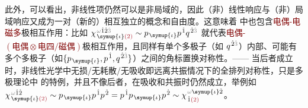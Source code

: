 此外，可以看出，非线性项仍然可以是非局域的，因此（非）线性响应与（非）局域响应又成为一对（新的）相互独立的概念和自由度。这意味着  中也包含\textcolor{Maroon}{电偶-电磁多}极相互作用：比如 $\chi^{\;\! \mathcolor{gray}{\omega} \hat{1} \hat{2} \mathcolor{gray}{\hat{3}}}_{\;\! \symup{\iota} \textcolor{Maroon}{(2)}} \sim p_{\;\! \symup{\iota}} p^{\;\! \hat{1}} q^{\;\! \hat{2} \mathcolor{gray}{\hat{3}}}$ 就代表\textcolor{Maroon}{电偶-$(\text{电偶}\otimes\text{电四/磁偶})$}极相互作用，且同样有单个多极子（如 $q^{\;\! \hat{2} \mathcolor{gray}{\hat{3}}}$）内部、可能有多个{多极子}（如$\{p_{\;\! \symup{\iota}}, p^{\;\! \hat{1}}, q^{\;\! \hat{2} \mathcolor{gray}{\hat{3}}}\}$）之间的角标置换对称性。—— 当后者成立时，非线性光学中无损/无耗散/无吸收即远离共振情况下的全排列对称性\cite{boydNonlinearOptics2019}，只是多极理论中  的特例，并且不像后者，在吸收和共振时仍然成立，举例如 $\chi^{\;\! \mathcolor{gray}{\omega} \hat{1} \hat{2}}_{\;\! \symup{\iota} \textcolor{Maroon}{(2)}} \sim p_{\;\! \symup{\iota}} p^{\;\! \hat{1}} p^{\;\! \hat{2}} = p^{\;\! \hat{1}} p_{\;\! \symup{\iota}} p^{\;\! \hat{2}} \sim \chi^{\;\! \mathcolor{gray}{\omega} \symup{\iota} \hat{2}}_{\;\! \hat{1} \textcolor{Maroon}{(2)}}$\cite{raabMultipoleTheoryElectromagnetism2004}。

